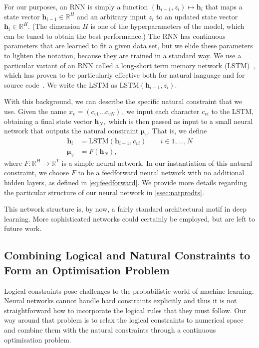 \documentclass[acmsmall, review, anonymous]{acmart}\settopmatter{printfolios=true,printccs=false,printacmref=false}
\newcommand{\margincomment}[2]{\marginpar{\scriptsize\color{Maroon}#1 says: #2}}
\newcommand{\ivp}[1]{\margincomment{IVP}{#1}}
\begin{document}
For our purposes, an RNN is simply a function $(\bm{h}_{i-1}, z_i) \mapsto \bm{h}_{i}$
that maps a state vector $\bm{h}_{i-1} \in \mathbb{R}^H$
and an arbitrary input $z_i$ to an updated state vector $\bm{h}_{i}  \in \mathbb{R}^H$.
(The dimension $H$ is one of the hyperparameters of the model, which can be tuned
to obtain the best performance.)
The RNN has continuous parameters that are learned to fit a given data set,
but we elide these parameters to lighten the notation, because they are trained in a standard way.
We use a particular variant of an RNN called a
long-short term memory network (LSTM)~\cite{hochreiter97},
which has proven to be particularly effective both for natural language
and for source code~\cite{sundermeyer2012,melis17,white2015,dam16}.
We write the LSTM as $\text{LSTM}(\bm{h}_{i-1}, z_i)$.

With this background, we can describe the specific natural constraint that we use.
Given the name $x_v = (c_{v1} \ldots c_{vN}),$ we input each character $c_{vi}$ to the LSTM,
obtaining a final state vector $\bm{h}_N,$ which is then passed as input to a small
neural network that outputs the natural constraint $\bm{\mu}_v$.
That is, we define
\begin{subequations}\label{eq:lstm}
	\begin{align}
		\bm{h}_i   & = \text{LSTM}(\bm{h}_{i-1}, c_{vi}) \qquad i \in 1, \ldots, N \\
		\bm{\mu}_v & = F(\bm{h}_N), \label{eq:lstmb}
	\end{align}
\end{subequations}
where $F: \mathbb{R}^H \rightarrow \mathbb{R}^T$ is a simple neural network.
In our instantiation of this natural constraint, we choose $F$ to be a feedforward neural network with
no additional hidden layers, as defined in \eqref{eq:feedforward}.
We provide more details regarding the particular structure of our neural network in \cref{ssec:natprodts}.

This network structure is, by now, a fairly standard architectural motif in deep learning.
More sophisticated networks could certainly be employed, but are left to future work.

\subsection{Combining Logical and Natural Constraints to Form an Optimisation Problem}\label{ssec:optimisation}
Logical constraints pose challenges to the probabilistic world of
machine learning.  Neural networks cannot handle hard constraints explicitly and 
thus it is not straightforward how to incorporate the logical rules that they must follow.
Our way around that problem is to relax the logical constraints to numerical
space and combine them with the natural constraints through a continuous
optimisation problem.
\end{document}
